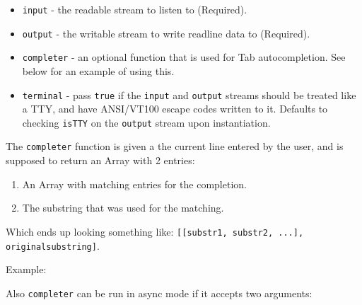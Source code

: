 \begin{itemize}
\item
  \texttt{input} - the readable stream to listen to (Required).
\item
  \texttt{output} - the writable stream to write readline data to
  (Required).
\item
  \texttt{completer} - an optional function that is used for Tab
  autocompletion. See below for an example of using this.
\item
  \texttt{terminal} - pass \texttt{true} if the \texttt{input} and
  \texttt{output} streams should be treated like a TTY, and have
  ANSI/VT100 escape codes written to it. Defaults to checking
  \texttt{isTTY} on the \texttt{output} stream upon instantiation.
\end{itemize}

The \texttt{completer} function is given a the current line entered by
the user, and is supposed to return an Array with 2 entries:

\begin{enumerate}
\item
  An Array with matching entries for the completion.
\item
  The substring that was used for the matching.
\end{enumerate}

Which ends up looking something like:
\texttt{{[}{[}substr1, substr2, ...{]}, originalsubstring{]}}.

Example:

\begin{Shaded}
\begin{Highlighting}[]
 
   \NormalTok{(}\NormalTok{)}
   \NormalTok{(}  \NormalTok{\})}
   \NormalTok{[} \NormalTok{: completions, line]}
\NormalTok{\}}
\end{Highlighting}
\end{Shaded}

Also \texttt{completer} can be run in async mode if it accepts two
arguments:

